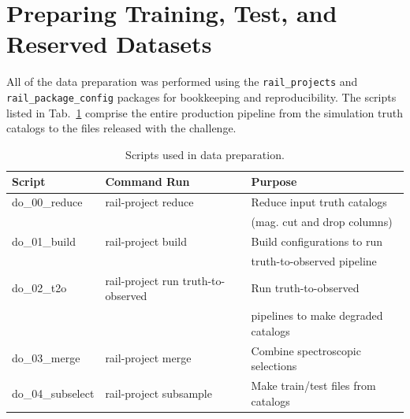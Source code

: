 \documentclass[11pt,twoside,letterpaper,onecolumn,english]{article}
\begin{document}
\section{Preparing Training, Test, and Reserved Datasets}
\label{sec:prep_process}

All of the data preparation was performed using the
\texttt{rail\_projects} and \texttt{rail\_package\_config} packages
for bookkeeping and reproducibility.  The scripts listed in Tab.~\ref{tab:prep_scripts}
comprise the entire production pipeline from the simulation truth catalogs
to the files released with the challenge. 

\begin{table}[ht]
\centering
\caption{\label{tab:prep_scripts}\small Scripts used
  in data preparation.}
\begin{tabular}{lll}
\hline \hline
Script & Command Run & Purpose \\ \hline
  do\_00\_reduce & rail-project reduce & Reduce input truth catalogs \\
  &  & (mag. cut and drop columns) \\ 
do\_01\_build & rail-project build & Build configurations to run \\
  &  & truth-to-observed pipeline \\
do\_02\_t2o & rail-project run truth-to-observed & Run truth-to-observed \\
  &  & pipelines to make degraded catalogs \\ 
do\_03\_merge & rail-project merge & Combine spectroscopic selections \\
do\_04\_subselect & rail-project subsample & Make train/test files from catalogs\\
\hline\hline
\end{tabular}
\end{table}


\newpage


\end{document}
